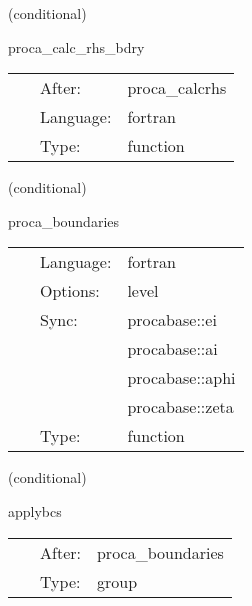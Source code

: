    (conditional) 

\hspace{5mm} proca\_calc\_rhs\_bdry 

\hspace{5mm}{\it mol boundary rhs calculation for proca variables } 


\hspace{5mm}

 \begin{tabular*}{160mm}{cll} 
~ & After:  & proca\_calcrhs \\ 
~ & Language:  & fortran \\ 
~ & Type:  & function \\ 
\end{tabular*} 


\vspace{5mm}

   (conditional) 

\hspace{5mm} proca\_boundaries 

\hspace{5mm}{\it mol boundary enforcement for proca variables } 


\hspace{5mm}

 \begin{tabular*}{160mm}{cll} 
~ & Language:  & fortran \\ 
~ & Options:  & level \\ 
~ & Sync:  & procabase::ei \\ 
~& ~ &procabase::ai\\ 
~& ~ &procabase::aphi\\ 
~& ~ &procabase::zeta\\ 
~ & Type:  & function \\ 
\end{tabular*} 


\vspace{5mm}

   (conditional) 

\hspace{5mm} applybcs 

\hspace{5mm}{\it apply boundary conditions } 


\hspace{5mm}

 \begin{tabular*}{160mm}{cll} 
~ & After:  & proca\_boundaries \\ 
~ & Type:  & group \\ 
\end{tabular*} 


